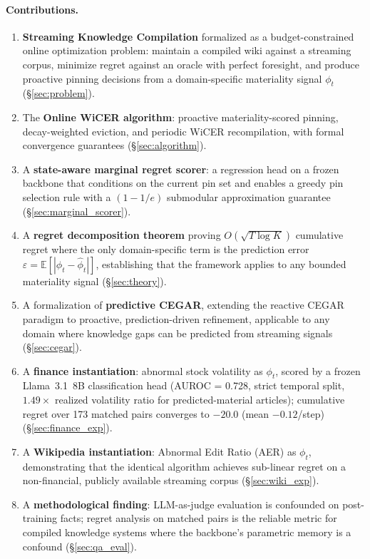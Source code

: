 \documentclass{article}
\begin{document}
\paragraph{Contributions.}
\begin{enumerate}
  \item \textbf{Streaming Knowledge Compilation} formalized as a budget-constrained online optimization problem: maintain a compiled wiki against a streaming corpus, minimize regret against an oracle with perfect foresight, and produce proactive pinning decisions from a domain-specific materiality signal $\phi_t$ (\S\ref{sec:problem}).
  \item The \textbf{Online WiCER algorithm}: proactive materiality-scored pinning, decay-weighted eviction, and periodic WiCER recompilation, with formal convergence guarantees (\S\ref{sec:algorithm}).
  \item A \textbf{state-aware marginal regret scorer}: a regression head on a frozen backbone that conditions on the current pin set and enables a greedy pin selection rule with a $(1-1/e)$ submodular approximation guarantee (\S\ref{sec:marginal_scorer}).
  \item A \textbf{regret decomposition theorem} proving $O(\sqrt{T \log K})$ cumulative regret where the only domain-specific term is the prediction error $\varepsilon = \mathbb{E}[|\phi_t - \hat{\phi}_t|]$, establishing that the framework applies to any bounded materiality signal (\S\ref{sec:theory}).
  \item A formalization of \textbf{predictive CEGAR}, extending the reactive CEGAR paradigm to proactive, prediction-driven refinement, applicable to any domain where knowledge gaps can be predicted from streaming signals (\S\ref{sec:cegar}).
  \item A \textbf{finance instantiation}: abnormal stock volatility as $\phi_t$, scored by a frozen Llama~3.1~8B classification head (AUROC = 0.728, strict temporal split, $1.49\times$ realized volatility ratio for predicted-material articles); cumulative regret over 173 matched pairs converges to $-20.0$ (mean $-0.12$/step) (\S\ref{sec:finance_exp}).
  \item A \textbf{Wikipedia instantiation}: Abnormal Edit Ratio (AER) as $\phi_t$, demonstrating that the identical algorithm achieves sub-linear regret on a non-financial, publicly available streaming corpus (\S\ref{sec:wiki_exp}).
  \item A \textbf{methodological finding}: LLM-as-judge evaluation is confounded on post-training facts; regret analysis on matched pairs is the reliable metric for compiled knowledge systems where the backbone's parametric memory is a confound (\S\ref{sec:qa_eval}).
\end{enumerate}
\end{document}
